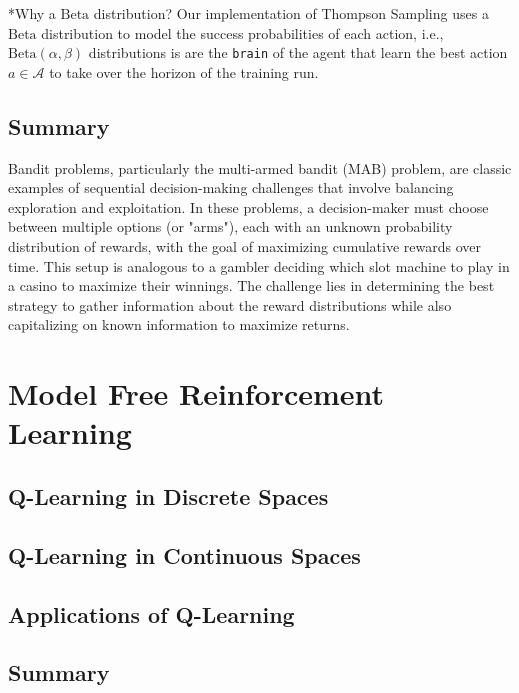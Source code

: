 \documentclass[11pt]{article}
\makeatletter
\theoremstyle{definition}
\renewcommand\subsubsection{\@startsection
	{subsubsection}{2}{0mm}
	{-0.05in}
	{-0.5\baselineskip}
	{\normalfont\normalsize\itshape\bfseries}}
\makeatother
\begin{document}
\subsubsection*{Why a $\text{Beta}$ distribution?}\label{sec:beta-distribution}
Our implementation of Thompson Sampling uses a $\text{Beta}$ distribution to model the success probabilities of each action, i.e., 
$\text{Beta}(\alpha,\beta)$ distributions is are the \texttt{brain} of the agent that learn the best action $a\in\mathcal{A}$ to take over
the horizon of the training run.

\subsection{Summary}
Bandit problems, particularly the multi-armed bandit (MAB) problem, are classic examples of sequential decision-making challenges that involve balancing exploration and exploitation. 
In these problems, a decision-maker must choose between multiple options (or "arms"), each with an unknown probability distribution of rewards, with the goal of maximizing cumulative rewards over time. 
This setup is analogous to a gambler deciding which slot machine to play in a casino to maximize their winnings. 
The challenge lies in determining the best strategy to gather information about the reward distributions while also capitalizing on known information to maximize returns.

\section{Model Free Reinforcement Learning}\label{sec:reinforcement-learning}
\subsection{Q-Learning in Discrete Spaces}\label{sec:q-learning}
\subsection{Q-Learning in Continuous Spaces}\label{sec:q-learning-continuous}
\subsection{Applications of Q-Learning}\label{sec:applications-of-q-learning}
\subsection{Summary}

\clearpage

\end{document}
